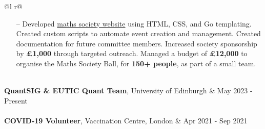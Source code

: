 \documentclass[a4paper,10pt]{letter}
\begin{document}
\begin{tabularx}{\linewidth}{ @{}l r@{} }
{\begin{minipage}[t]{\linewidth}
\begin{itemize}[nosep,after=\strut, leftmargin=1em, itemsep=3pt]
                \item[--] Developed \href{https://mathsoc.tardis.ac}{maths society website} using HTML, CSS, and Go templating. Created custom scripts to automate event creation and management. Created documentation for future committee members. Increased society sponsorship by \textbf{£1,000} through targeted outreach. Managed a budget of \textbf{£12,000} to organise the Maths Society Ball, for \textbf{150+ people}, as part of a small team. 
            \end{itemize}
        \end{minipage}
        } \\ 
        \textbf{QuantSIG \& EUTIC Quant Team}, University of Edinburgh & \hfill May 2023 - Present \\
         \\ 
    \textbf{COVID-19 Volunteer}, Vaccination Centre, London & \hfill Apr 2021 - Sep 2021 \\

\end{tabularx}
\end{document}
